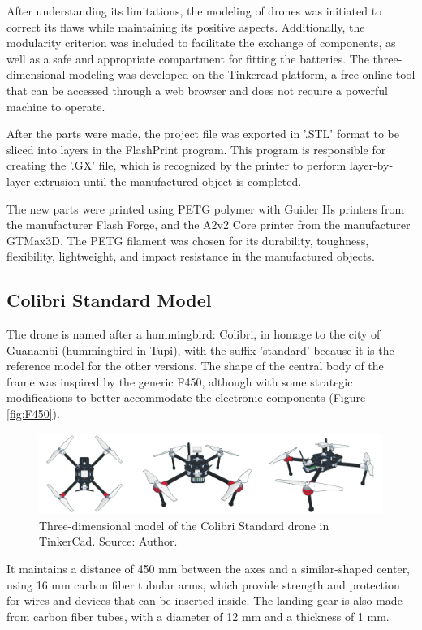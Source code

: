 \documentclass[conference]{IEEEtran}
\begin{document}
After understanding its limitations, the modeling of drones was initiated to correct its flaws while maintaining its positive aspects. Additionally, the modularity criterion was included to facilitate the exchange of components, as well as a safe and appropriate compartment for fitting the batteries. The three-dimensional modeling was developed on the Tinkercad platform, a free online tool that can be accessed through a web browser and does not require a powerful machine to operate.

After the parts were made, the project file was exported in '.STL' format to be sliced into layers in the FlashPrint program. This program is responsible for creating the '.GX' file, which is recognized by the printer to perform layer-by-layer extrusion until the manufactured object is completed.

The new parts were printed using PETG polymer with Guider IIs printers from the manufacturer Flash Forge, and the A2v2 Core printer from the manufacturer GTMax3D. The PETG filament was chosen for its durability, toughness, flexibility, lightweight, and impact resistance in the manufactured objects.

\subsection{Colibri Standard Model}

The drone is named after a hummingbird: Colibri, in homage to the city of Guanambi (hummingbird in Tupi), with the suffix 'standard' because it is the reference model for the other versions. The shape of the central body of the frame was inspired by the generic F450, although with some strategic modifications to better accommodate the electronic components (Figure \ref{fig:F450}).

\begin{figure}[!htb]
    \centering
    \includegraphics[scale=0.14]{img/Colibri-standard.png} 
    \caption{Three-dimensional model of the Colibri Standard drone in TinkerCad. Source: Author.}
    \label{fig:ColibriStandard}
\end{figure}

It maintains a distance of 450 mm between the axes and a similar-shaped center, using 16 mm carbon fiber tubular arms, which provide strength and protection for wires and devices that can be inserted inside. The landing gear is also made from carbon fiber tubes, with a diameter of 12 mm and a thickness of 1 mm.
\end{document}

